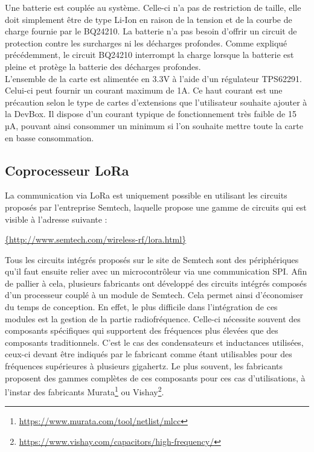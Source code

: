 Une batterie est couplée au système. Celle-ci n'a pas de restriction de taille, elle doit simplement être de type Li-Ion en raison de la tension et de la courbe de charge fournie par le BQ24210. La batterie n'a pas besoin d'offrir un circuit de protection contre les surcharges ni les décharges profondes. Comme expliqué précédemment, le circuit BQ24210 interrompt la charge lorsque la batterie est pleine et protège la batterie des décharges profondes.  \\

L'ensemble de la carte est alimentée en 3.3V à l'aide d'un régulateur TPS62291. Celui-ci peut fournir un courant maximum de 1A. Ce haut courant est une précaution selon le type de cartes d'extensions que l'utilisateur souhaite ajouter à la DevBox. Il dispose d'un courant typique de fonctionnement très faible de 15 µA, pouvant ainsi consommer un minimum si l'on souhaite mettre toute la carte en basse consommation.

\FloatBarrier
\subsection{Coprocesseur LoRa}

La communication via LoRa est uniquement possible en utilisant les circuits proposés par l'entreprise Semtech, laquelle propose une gamme de circuits qui est visible à l'adresse suivante : 
\begin{center}
    \url{{http://www.semtech.com/wireless-rf/lora.html}}
\end{center}

Tous les circuits intégrés proposés sur le site de Semtech sont des périphériques qu'il faut ensuite relier avec un microcontrôleur via une communication SPI. Afin de pallier à cela, plusieurs fabricants ont développé des circuits intégrés composés d'un processeur couplé à un module de Semtech. Cela permet ainsi d'économiser du temps de conception. En effet, le plus difficile dans l'intégration de ces modules est la gestion de la partie radiofréquence. Celle-ci nécessite souvent des composants spécifiques qui supportent des fréquences plus élevées que des composants traditionnels. C'est le cas des condensateurs et inductances utilisées, ceux-ci devant être indiqués par le fabricant comme étant utilisables pour des fréquences supérieures à plusieurs gigahertz. Le plus souvent, les fabricants proposent des gammes complètes de ces composants pour ces cas d'utilisations, à l'instar des fabricants Murata\footnote{\url{https://www.murata.com/tool/netlist/mlcc}} ou Vishay\footnote{\url{https://www.vishay.com/capacitors/high-frequency/}}. \\

